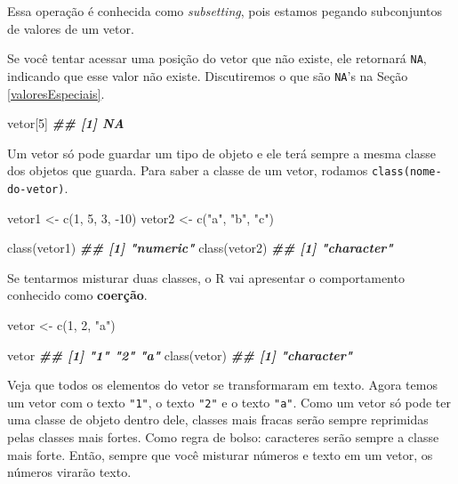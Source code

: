 \documentclass[
]{book}
\newenvironment{Shaded}{\begin{snugshade}}{\end{snugshade}}
\newcommand{\DecValTok}[1]{\textcolor[rgb]{0.00,0.00,0.81}{#1}}
\newcommand{\DocumentationTok}[1]{\textcolor[rgb]{0.56,0.35,0.01}{\textbf{\textit{#1}}}}
\newcommand{\FunctionTok}[1]{\textcolor[rgb]{0.00,0.00,0.00}{#1}}
\newcommand{\NormalTok}[1]{#1}
\newcommand{\OtherTok}[1]{\textcolor[rgb]{0.56,0.35,0.01}{#1}}
\newcommand{\SpecialCharTok}[1]{\textcolor[rgb]{0.00,0.00,0.00}{#1}}
\newcommand{\StringTok}[1]{\textcolor[rgb]{0.31,0.60,0.02}{#1}}
\begin{document}
Essa operação é conhecida como \emph{subsetting}, pois estamos pegando subconjuntos de valores de um vetor.

Se você tentar acessar uma posição do vetor que não existe, ele retornará \texttt{NA}, indicando que esse valor não existe. Discutiremos o que são \texttt{NA}'s na Seção \ref{valoresEspeciais}.

\begin{Shaded}
\begin{Highlighting}[]
\NormalTok{vetor[}\DecValTok{5}\NormalTok{]}
\DocumentationTok{\#\# [1] NA}
\end{Highlighting}
\end{Shaded}

Um vetor só pode guardar um tipo de objeto e ele terá sempre a mesma classe dos objetos que guarda. Para saber a classe de um vetor, rodamos \texttt{class(nome-do-vetor)}.

\begin{Shaded}
\begin{Highlighting}[]
\NormalTok{vetor1 }\OtherTok{\textless{}{-}} \FunctionTok{c}\NormalTok{(}\DecValTok{1}\NormalTok{, }\DecValTok{5}\NormalTok{, }\DecValTok{3}\NormalTok{, }\SpecialCharTok{{-}}\DecValTok{10}\NormalTok{)}
\NormalTok{vetor2 }\OtherTok{\textless{}{-}} \FunctionTok{c}\NormalTok{(}\StringTok{"a"}\NormalTok{, }\StringTok{"b"}\NormalTok{, }\StringTok{"c"}\NormalTok{)}

\FunctionTok{class}\NormalTok{(vetor1)}
\DocumentationTok{\#\# [1] "numeric"}
\FunctionTok{class}\NormalTok{(vetor2)}
\DocumentationTok{\#\# [1] "character"}
\end{Highlighting}
\end{Shaded}

Se tentarmos misturar duas classes, o R vai apresentar o comportamento conhecido como \textbf{coerção}.

\begin{Shaded}
\begin{Highlighting}[]
\NormalTok{vetor }\OtherTok{\textless{}{-}} \FunctionTok{c}\NormalTok{(}\DecValTok{1}\NormalTok{, }\DecValTok{2}\NormalTok{, }\StringTok{"a"}\NormalTok{)}

\NormalTok{vetor}
\DocumentationTok{\#\# [1] "1" "2" "a"}
\FunctionTok{class}\NormalTok{(vetor)}
\DocumentationTok{\#\# [1] "character"}
\end{Highlighting}
\end{Shaded}

Veja que todos os elementos do vetor se transformaram em texto. Agora temos um vetor com o texto \texttt{"1"}, o texto \texttt{"2"} e o texto \texttt{"a"}. Como um vetor só pode ter uma classe de objeto dentro dele, classes mais fracas serão sempre reprimidas pelas classes mais fortes. Como regra de bolso: caracteres serão sempre a classe mais forte. Então, sempre que você misturar números e texto em um vetor, os números virarão texto.
\end{document}

